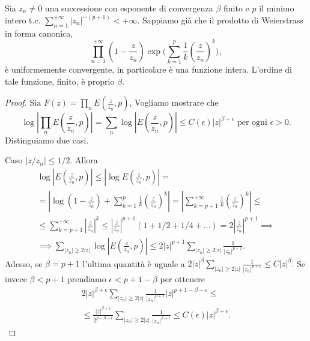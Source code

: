 \begin{thm} \label{1.2.14}
  Sia $z_n\not=0$ una successione con esponente di convergenza $\beta$ finito e $p$ il minimo intero t.c. $\displaystyle \sum_{n=1}^{+\infty} |z_n|^{-(p+1)}<+\infty$. Sappiamo già che il prodotto di Weierstrass in forma canonica,
  $$\prod_{n=1}^{+\infty} \left(1-\frac{z}{z_n}\right)\exp\Bigg(\sum_{k=1}^p\frac{1}{k}\left(\frac{z}{z_n}\right)^k\Bigg),$$
  è uniformemente convergente, in particolare è una funzione intera. L'ordine di tale funzione, finito, è proprio $\beta$.
\end{thm}

\begin{proof}
  Sia $\displaystyle F(z)=\prod_nE\left(\frac{z}{z_n},p\right)$, Vogliamo mostrare che
  $$\log\left|\prod_nE\left(\frac{z}{z_n},p\right)\right|=\sum_n\log\left|E\left(\frac{z}{z_n},p\right)\right| \le C(\epsilon)|z|^{\beta+\epsilon} \text{ per ogni } \epsilon>0.$$
  Distinguiamo due casi.

  Caso $|z/z_n| \le 1/2$. Allora
  \begin{gather*}
    \log\left|E\left(\frac{z}{z_n},p\right)\right| \le \left|\log{E\left(\frac{z}{z_n},p\right)}\right|= \\
    =\left|\log\left(1-\frac{z}{z_n}\right)+\sum_{k=1}^p \frac{1}{k}\left(\frac{z}{z_n}\right)^k\right|=\left|\sum_{k=p+1}^{+\infty} \frac{1}{k} \left(\frac{z}{z_n}\right)^k\right| \le \\
    \le \sum_{k=p+1}^{+\infty} \left|\frac{z}{z_n}\right|^k \le \left|\frac{z}{z_n}\right|^{p+1}(1+1/2+1/4+\dots)=2\left|\frac{z}{z_n}\right|^{p+1} \implies \\
    \implies \sum_{|z_n| \ge 2|z|} \log\left|E\left(\frac{z}{z_n},p\right)\right| \le 2|z|^{p+1} \sum_{|z_n| \ge 2|z|} \frac{1}{|z_n|^{p+1}}.
  \end{gather*}
  Adesso, se $\beta=p+1$ l'ultima quantità è uguale a $\displaystyle 2|z|^{\beta}\sum_{|z_n| \ge 2|z|} \frac{1}{|z_n|^{p+1}} \le C|z|^{\beta}$. Se invece $\beta<p+1$ prendiamo $\epsilon<p+1-\beta$ per ottenere
  \begin{gather*}
    2|z|^{\beta+\epsilon}\sum_{|z_n| \ge 2|z|} \frac{1}{|z_n|^{p+1}}|z|^{p+1-\beta-\epsilon} \le \\
    \le \frac{|z|^{\beta+\epsilon}}{2^{p-\beta-\epsilon}}\sum_{|z_n| \ge 2|z|} \frac{1}{|z_n|^{\beta+\epsilon}} \le C(\epsilon)|z|^{\beta+\epsilon}.
  \end{gather*}


\end{proof}
